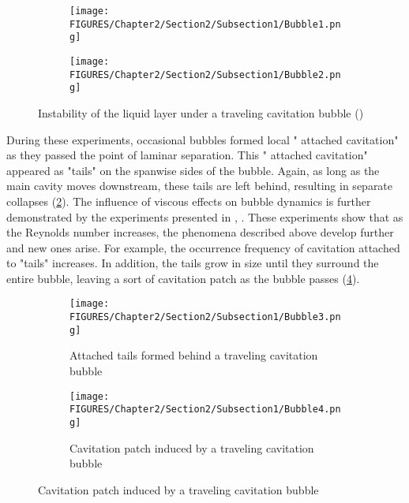 \begin{figure}[htbp!]
    \centering
    \begin{subfigure}{0.47\textwidth}
        \centering
        \texttt{[image: FIGURES/Chapter2/Section2/Subsection1/Bubble1.png]}
    \end{subfigure}%
    \hfill
    \begin{subfigure}{0.47\textwidth}
        \centering
        \texttt{[image: FIGURES/Chapter2/Section2/Subsection1/Bubble2.png]} 
    \end{subfigure}
    \caption{Instability of the liquid layer under a traveling cavitation bubble (\cite{brennen2014cavitation})}
    \label{fig:BubbleInstability}
\end{figure}

During these experiments, occasional bubbles formed local " attached cavitation" as they passed the point of laminar separation. This " attached cavitation" appeared as "tails" on the spanwise sides of the bubble. Again, as long as the main cavity moves downstream, these tails are left behind, resulting in separate collapses (\ref{fig:BubbleTails}).
The influence of viscous effects on bubble dynamics is further demonstrated by the experiments presented in \cite{DeChizelle_Ceccio_Brennen_1994}, \cite{DeChizelle_Ceccio_Brennen_1995}. These experiments show that as the Reynolds number increases, the phenomena described above develop further and new ones arise. For example, the occurrence frequency of cavitation attached to "tails" increases. In addition, the tails grow in size until they surround the entire bubble, leaving a sort of cavitation patch as the bubble passes (\ref{fig:BubblePatches}). 

\begin{figure}[htbp!]
    \centering
    \begin{subfigure}{0.47\textwidth}
        \centering
        \texttt{[image: FIGURES/Chapter2/Section2/Subsection1/Bubble3.png]}
        \caption{Attached tails formed behind a traveling cavitation bubble \cite{brennen2014cavitation}}
        \label{fig:BubbleTails}
    \end{subfigure}%
    \hfill
    \begin{subfigure}{0.47\textwidth}
        \centering
        \texttt{[image: FIGURES/Chapter2/Section2/Subsection1/Bubble4.png]} 
        \caption{Cavitation patch induced by a traveling cavitation bubble \cite{brennen2014cavitation}}
        \label{fig:BubblePatches}
    \end{subfigure}
\end{figure}

